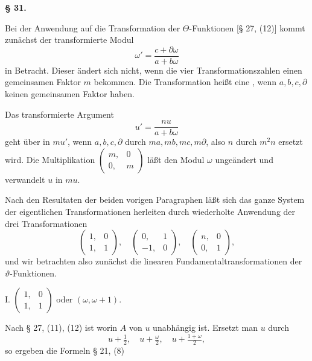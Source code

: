 \begin{center}
\textbf{§ 31. }
\end{center}

Bei der Anwendung auf die Transformation der $\Theta$-Funktionen
[§ 27, (12)] kommt zunächst der transformierte Modul
\[
\omega' = \dfrac{c + \partial\omega}{a + b\omega}
\]
in Betracht. Dieser ändert sich nicht, wenn die vier Transformationszahlen
 einen gemeinsamen Faktor $m$ bekommen. Die
Transformation heißt eine , wenn $a, b, c, \partial$ keinen
gemeinsamen Faktor haben.

Das transformierte Argument
\[
u' = \dfrac{nu}{a + b\omega}
\]
geht über in $mu'$, wenn $a, b, c, \partial$ durch $ma, mb, mc, m\partial$, also $n$
durch $m^2n$ ersetzt wird. Die Multiplikation $\begin{pmatrix}m, & 0\\0, & m\end{pmatrix}$ läßt den
Modul $\omega$ ungeändert und verwandelt $u$ in $mu$.

Nach den Resultaten der beiden vorigen Paragraphen läßt
sich das ganze System der eigentlichen Transformationen herleiten
 durch wiederholte Anwendung der drei Transformationen
\[
\begin{pmatrix}1, & 0\\1, & 1\end{pmatrix}, \quad \begin{pmatrix}0, & 1\\-1, & 0\end{pmatrix}, \quad \begin{pmatrix}n, & 0\\0, & 1\end{pmatrix},
\]
und wir betrachten also zunächst die linearen Fundamentaltransformationen
 der $\vartheta$-Funktionen.

I. $\begin{pmatrix}1, & 0\\1, & 1\end{pmatrix}$ oder $(\omega, \omega + 1)$.

Nach § 27, (11), (12) ist
worin $A$ von $u$ unabhängig ist. Ersetzt man $u$ durch
\[
u + \tfrac{1}{2}, \quad u + \tfrac{\omega}{2}, \quad u + \tfrac{1+\omega}{2},
\]
so ergeben die Formeln § 21, (8)
